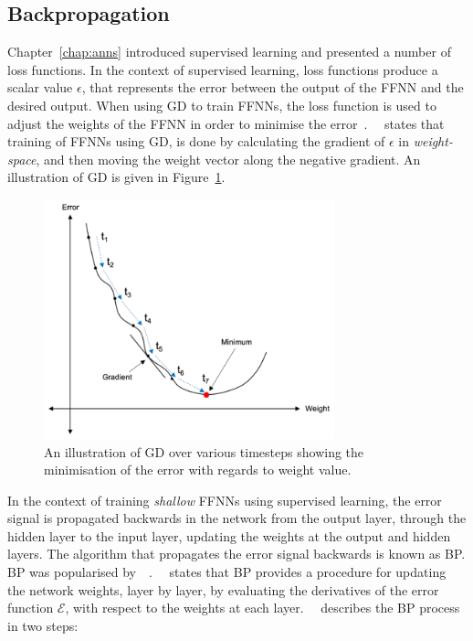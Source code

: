 \subsection{Backpropagation}\label{sec:heuristics:gd:backpropagation}

Chapter~\ref{chap:anns} introduced supervised learning and presented a number of loss functions. In the context of supervised learning, loss functions produce a scalar value $\epsilon$, that represents the error between the output of the \acs{FFNN} and the desired output. When using \acs{GD} to train \acp{FFNN}, the loss function is used to adjust the weights of the \acs{FFNN} in order to minimise the error~\cite{ref:engelbrecht:2007}.~\citeauthor{ref:engelbrecht:2007}~\cite{ref:engelbrecht:2007} states that training of \acp{FFNN} using \acs{GD}, is done by calculating the gradient of $\epsilon$ in \textit{weight-space}, and then moving the weight vector along the negative gradient. An illustration of \acs{GD} is given in Figure~\ref{fig:heuristics:gd:gd_illustration}.

\begin{figure}[htbp]
      \centering
      \includegraphics[width=0.75\textwidth]{images/gradient_descent.pdf}
      \caption{An illustration of \acf{GD} over various timesteps showing the minimisation of the error with regards to weight value.}
      \label{fig:heuristics:gd:gd_illustration}
\end{figure}

In the context of training \textit{shallow} \acp{FFNN} using supervised learning, the error signal is propagated backwards in the network from the output layer, through the hidden layer to the input layer, updating the weights at the output and hidden layers. The algorithm that propagates the error signal backwards is known as \acf{BP}. \Acs{BP} was popularised by~\citeauthor{ref:werbos:1994}~\cite{ref:werbos:1994}.~\citeauthor{ref:nel:2021}~\cite{ref:nel:2021} states that \acs{BP} provides a procedure for updating the network weights, layer by layer, by evaluating the derivatives of the error function $\mathcal{E}$, with respect to the weights at each layer.~\citeauthor{ref:engelbrecht:2007}~\cite{ref:engelbrecht:2007} describes the \acs{BP} process in two steps:

